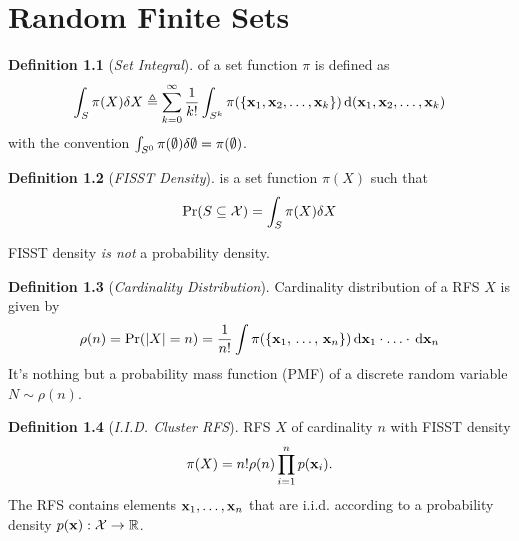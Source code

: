 \documentclass[a4paper,10pt]{scrreprt}
\theoremstyle{theorem}
\theoremstyle{definition}
\newtheorem{defn}{Definition}
\begin{document}
\chapter{Random Finite Sets}\label{ch:random_finite_sets}

\begin{defn}[\emph{Set Integral}]
	 of a set function \( \pi \) is defined as
	\begin{equation}\label{eq:set_integral}
		\int_S \pi(X) \dsx[X] \triangleq \sum_{k=0}^{\infty}\frac{1}{k!}\int_{S^k} \pi(\Bqty{\inVar_1, \inVar_2, \ldots, \inVar_k}) \dx[(\inVar_1, \inVar_2, \ldots, \inVar_k)]
	\end{equation}
	with the convention \( \int_{S^0} \pi(\emptyset) \dsx[\emptyset] = \pi(\emptyset) \).
\end{defn}

\begin{defn}[\emph{FISST Density}]
	 is a set function \( \pi(X) \) such that 
	\begin{equation}\label{eq:fiist_density}
		\Pr(S \subseteq \mathcal{X}) = \int_S \pi(X) \dsx[X]
	\end{equation}
\end{defn}
FISST density \emph{is not} a probability density.

\begin{defn}[\emph{Cardinality Distribution}]
	Cardinality distribution of a RFS \( X \) is given by
	\begin{equation}\label{key}
		\rho(n) = \Pr(|X|=n) = \frac{1}{n!}\int \pi(\Bqty{\stVar_1,\, \ldots,\, \stVar_n}) \dx[\stVar_1]\cdot\ldots\cdot\dx[\stVar_n]
	\end{equation}
	It's nothing but a probability mass function (PMF) of a discrete random variable \( N \sim \rho(n) \).
\end{defn}

\begin{defn}[\emph{I.I.D. Cluster RFS}]
	RFS \( X \) of cardinality \( n \) with FISST density
	\begin{equation}\label{key}
		\pi(X) = n! \rho(n) \prod_{i=1}^{n} p(\stVar_i).
	\end{equation}
	The RFS contains elements \( \stVar_1, \ldots, \stVar_n \) that are i.i.d. according to a probability density \( p(\stVar): \stSp\to\R \).
\end{defn}
\end{document}
